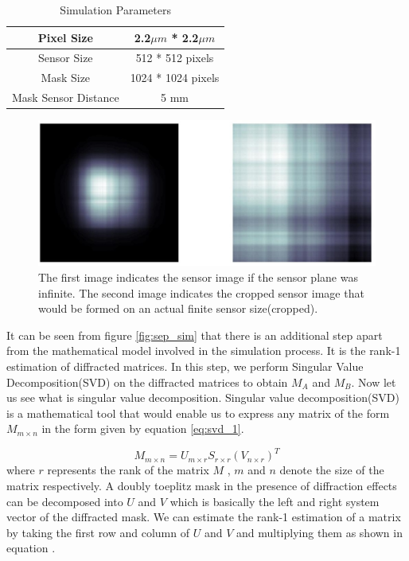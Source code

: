 \begin{table}[ht]
\centering
\caption{Simulation Parameters}
\label{tbl:sim_parameters}
\begin{tabular}{|c|c|}
\hline
Pixel Size & 2.2$\mu m$ * 2.2$\mu m$\\
\hline
Sensor Size & 512 * 512 pixels\\
\hline     
Mask Size & 1024 * 1024 pixels\\
\hline 
Mask Sensor Distance & 5 mm \\
\hline 
\end{tabular}
\end{table}

\begin{figure}[ht]
\includegraphics[scale = 0.50]{pics/sensorCropped}
\caption{The first image indicates the sensor image if the sensor plane was infinite. The second image indicates the cropped sensor image that would be formed on an actual finite sensor size(cropped).}
\label{fig:moon_image}
\end{figure}

It can be seen from figure \ref{fig:sep_sim} that there is an additional step apart from the mathematical model involved in the simulation process. It is the rank-1 estimation of diffracted matrices. In this step, we perform Singular Value Decomposition(SVD) on the diffracted matrices to obtain $M_A$ and $M_B$. Now let us see what is singular value decomposition. Singular value decomposition(SVD) is a mathematical tool that would enable us to express any matrix of the form $M_{ m \times n}$ in the form given by equation \ref{eq:svd_1}\cite{svd}. 

\begin{equation}
\label{eq:svd_1}
M_{m \times n} = U_{m \times r}S_{r\times r}(V_{n \times r})^T
\end{equation}
where $r$ represents the rank of the matrix $M$ , $m$ and $n$ denote the size of the matrix respectively. A doubly toeplitz mask in the presence of diffraction effects can be decomposed into $U$ and $V$ which is basically the left and right system vector of the diffracted mask. We can estimate the rank-1 estimation of a matrix by taking the first row and column of $U$ and $V$ and multiplying them as shown in equation \label{eq:svd_2}.

